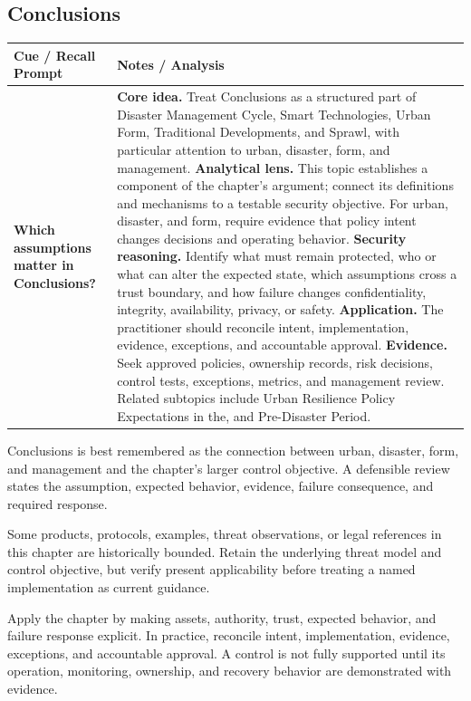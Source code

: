 \documentclass[11pt]{article}
\newcommand{\CornellHeader}{%
\rowcolor{Navy}\color{white}\bfseries Cue / Recall Prompt & \color{white}\bfseries Notes / Analysis\\\hline}
\newcommand{\CornellRow}[2]{%
\cellcolor{CueGray}\RaggedRight\textbf{#1} & \RaggedRight #2\\\hline}
\begin{document}
\subsection*{Conclusions}
\begin{longtable}{>{\RaggedRight\arraybackslash}p{}|>{\RaggedRight\arraybackslash}p{}}
\CornellHeader
\CornellRow{Which assumptions matter in Conclusions?}{\textbf{Core idea.} Treat Conclusions as a structured part of Disaster Management Cycle, Smart Technologies, Urban Form, Traditional Developments, and Sprawl, with particular attention to urban, disaster, form, and management. \textbf{Analytical lens.} This topic establishes a component of the chapter's argument; connect its definitions and mechanisms to a testable security objective. For urban, disaster, and form, require evidence that policy intent changes decisions and operating behavior. \textbf{Security reasoning.} Identify what must remain protected, who or what can alter the expected state, which assumptions cross a trust boundary, and how failure changes confidentiality, integrity, availability, privacy, or safety. \textbf{Application.} The practitioner should reconcile intent, implementation, evidence, exceptions, and accountable approval. \textbf{Evidence.} Seek approved policies, ownership records, risk decisions, control tests, exceptions, metrics, and management review. Related subtopics include Urban Resilience Policy Expectations in the, and Pre-Disaster Period.}
\end{longtable}
\begin{topicsummary}
Conclusions is best remembered as the connection between urban, disaster, form, and management and the chapter's larger control objective. A defensible review states the assumption, expected behavior, evidence, failure consequence, and required response.
\end{topicsummary}
\begin{historybox}
Some products, protocols, examples, threat observations, or legal references in this chapter are historically bounded. Retain the underlying threat model and control objective, but verify present applicability before treating a named implementation as current guidance.
\end{historybox}
\begin{defensebox}
Apply the chapter by making assets, authority, trust, expected behavior, and failure response explicit. In practice, reconcile intent, implementation, evidence, exceptions, and accountable approval. A control is not fully supported until its operation, monitoring, ownership, and recovery behavior are demonstrated with evidence.
\end{defensebox}
\end{document}
